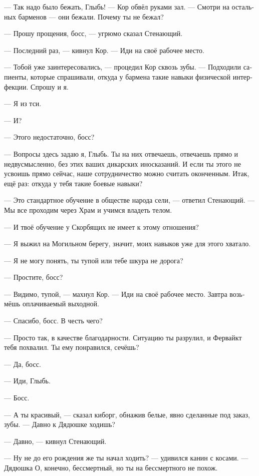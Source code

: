 \documentclass[a4paper,12pt,fleqn]{book}\usepackage{cooltooltips}\usepackage{polyglossia}\setdefaultlanguage[babelshorthands=true]{russian}\setotherlanguage{english}\defaultfontfeatures{Ligatures=TeX,Mapping=tex-text} \usepackage{xcolor}\definecolor{lightgray}{HTML}{bbbbbb}\color{lightgray}\newcommand{\ml}[3]{\textenglish{\textcolor{black}{#3}}}
\newcommand{\asterism}{\vspace{1em}{\centering\Large\bfseries$\ast~\ast~\ast$\par}\vspace{1em}}
\begin{document}
--- Так надо было бежать, Глыбь! --- Кор обвёл руками зал.
--- Смотри на остальных барменов --- они бежали.
Почему ты не бежал?

--- Прошу прощения, босс, --- угрюмо сказал Стенающий.

--- Последний раз, --- кивнул Кор.
--- Иди на своё рабочее место.

\asterism

--- Тобой уже заинтересовались, --- процедил Кор сквозь зубы.
--- Подходили сапиенты, которые спрашивали, откуда у бармена такие навыки физической интерфекции.
Спрошу и я.

--- Я из тси.

--- И?

--- Этого недостаточно, босс?

--- Вопросы здесь задаю я, Глыбь.
Ты на них отвечаешь, отвечаешь прямо и недвусмысленно, без этих ваших дикарских иносказаний.
И если ты этого не усвоишь прямо сейчас, наше сотрудничество можно считать оконченным.
Итак, ещё раз: откуда у тебя такие боевые навыки?

--- Это стандартное обучение в обществе народа сели, --- ответил Стенающий.
--- Мы все проходим через Храм и учимся владеть телом.

--- И твоё обучение у Скорбящих не имеет к этому отношения?

--- Я выжил на Могильном берегу, значит, моих навыков уже для этого хватало.

--- Я не могу понять, ты тупой или тебе шкура не дорога?

--- Простите, босс?

--- Видимо, тупой, --- махнул Кор.
--- Иди на своё рабочее место.
Завтра возьмёшь оплачиваемый выходной.

--- Спасибо, босс.
В честь чего?

--- Просто так, в качестве благодарности.
Ситуацию ты разрулил, и Фервайкт тебя похвалил.
Ты ему понравился, сечёшь?

--- Да, босс.

--- Иди, Глыбь.

--- Босс.

\asterism

--- А ты красивый, --- сказал киборг, обнажив белые, явно сделанные под заказ, зубы.
--- Давно к Дядюшке ходишь?

--- Давно, --- кивнул Стенающий.

--- Ну не до его рождения же ты начал ходить? --- удивился канин с косами.
--- Дядюшка О, конечно, бессмертный, но ты на бессмертного не похож.
\end{document}
